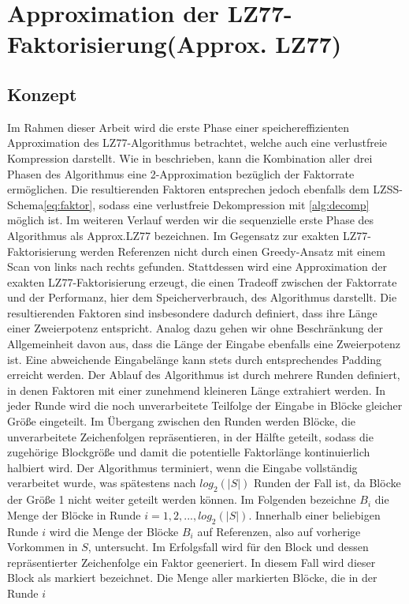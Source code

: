 \section{Approximation der LZ77-Faktorisierung(Approx. LZ77)}
\subsection{Konzept}
Im Rahmen dieser Arbeit wird die erste Phase einer speichereffizienten Approximation des LZ77-Algorithmus betrachtet, welche auch eine verlustfreie Kompression darstellt. 
Wie in \cite{ApproxLZ77} beschrieben, kann die Kombination aller drei Phasen des Algorithmus eine 2-Approximation bezüglich der Faktorrate ermöglichen. Die resultierenden 
Faktoren entsprechen jedoch ebenfalls dem LZSS-Schema\ref{eq:faktor}, sodass eine verlustfreie Dekompression mit \ref{alg:decomp} möglich ist. Im weiteren Verlauf werden wir 
die sequenzielle erste Phase des Algorithmus als Approx.LZ77 bezeichnen. Im Gegensatz zur exakten LZ77-Faktorisierung werden Referenzen nicht durch einen Greedy-Ansatz mit 
einem Scan von links nach rechts gefunden. Stattdessen wird eine Approximation der exakten LZ77-Faktorisierung erzeugt, die einen Tradeoff zwischen der Faktorrate und der Performanz,
hier dem Speicherverbrauch, des Algorithmus darstellt. Die resultierenden Faktoren sind insbesondere dadurch definiert, dass ihre Länge einer Zweierpotenz entspricht. Analog dazu 
gehen wir ohne Beschränkung der Allgemeinheit davon aus, dass die Länge der Eingabe ebenfalls eine Zweierpotenz ist. Eine abweichende Eingabelänge kann stets durch entsprechendes 
Padding erreicht werden. 
Der Ablauf des Algorithmus ist durch mehrere Runden definiert, in denen Faktoren mit einer zunehmend kleineren Länge extrahiert werden. In jeder Runde wird die noch unverarbeitete
Teilfolge der Eingabe in Blöcke gleicher Größe eingeteilt. Im Übergang zwischen den Runden werden Blöcke, die unverarbeitete Zeichenfolgen repräsentieren, in der Hälfte geteilt,
sodass die zugehörige Blockgröße und damit die potentielle Faktorlänge kontinuierlich halbiert wird. Der Algorithmus terminiert, wenn die Eingabe vollständig verarbeitet wurde, 
was spätestens nach $log_2(|S|)$ Runden der Fall ist, da Blöcke der Größe 1 nicht weiter geteilt werden können. Im Folgenden bezeichne $B_i$ die Menge der Blöcke in Runde 
$i=1,2,...,log_2(|S|)$.
Innerhalb einer beliebigen Runde $i$ wird die Menge der Blöcke $B_i$ auf Referenzen, also auf vorherige Vorkommen in $S$, untersucht. Im Erfolgsfall wird für den Block und
dessen repräsentierter Zeichenfolge ein Faktor geeneriert. In diesem Fall wird dieser Block als markiert bezeichnet. Die Menge aller markierten Blöcke, die in der Runde $i$
